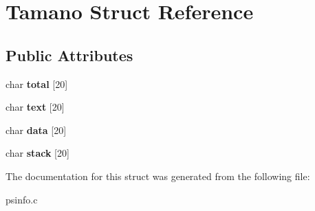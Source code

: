 \hypertarget{structTamano}{}\section{Tamano Struct Reference}
\label{structTamano}
\subsection*{Public Attributes}
\begin{DoxyCompactItemize}
\item 
char {\bfseries total} \mbox{[}20\mbox{]}\hypertarget{structTamano_a483d429127ea7284d716d880deef6d9a}{}\label{structTamano_a483d429127ea7284d716d880deef6d9a}

\item 
char {\bfseries text} \mbox{[}20\mbox{]}\hypertarget{structTamano_a5f684461a4673e36bebf49713482ded9}{}\label{structTamano_a5f684461a4673e36bebf49713482ded9}

\item 
char {\bfseries data} \mbox{[}20\mbox{]}\hypertarget{structTamano_a695407bb0fa2f9e04004469c79b20f1e}{}\label{structTamano_a695407bb0fa2f9e04004469c79b20f1e}

\item 
char {\bfseries stack} \mbox{[}20\mbox{]}\hypertarget{structTamano_afc171294f74ce7b3bdd3e8eb1c6187cf}{}\label{structTamano_afc171294f74ce7b3bdd3e8eb1c6187cf}

\end{DoxyCompactItemize}


The documentation for this struct was generated from the following file\+:\begin{DoxyCompactItemize}
\item 
psinfo.\+c\end{DoxyCompactItemize}

